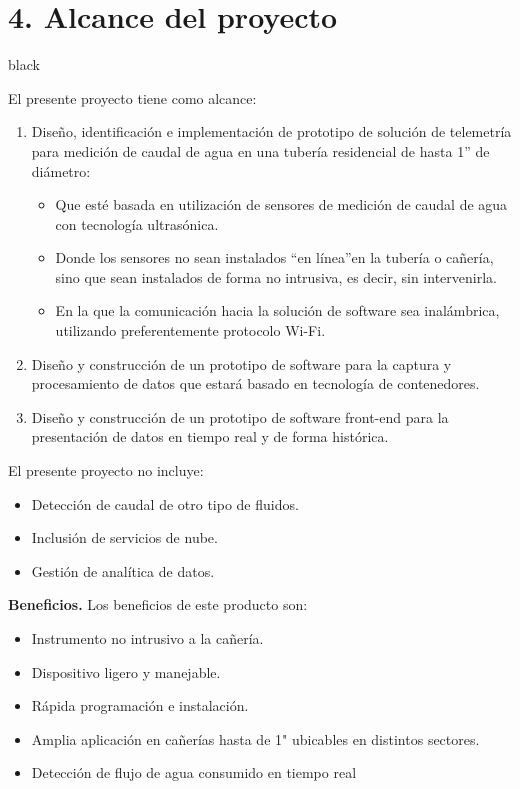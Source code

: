 \documentclass[
11pt, %
codirector, %
]{charter}
\begin{document}
\section{4. Alcance del proyecto}
\label{sec:alcance}

\begin{consigna}{black}

El presente proyecto tiene como alcance:

\begin{enumerate}
\item Diseño, identificación e implementación de prototipo de solución de telemetría para medición de caudal de agua en una tubería residencial de hasta 1'' de diámetro:
\begin{itemize}
	\item Que esté basada en utilización de sensores de medición de caudal de agua con tecnología ultrasónica.
	\item Donde los sensores no sean instalados \textquotedblleft{en línea}\textquotedblright  en la tubería o cañería, sino que sean instalados de forma no intrusiva, es decir, sin intervenirla.
	\item En la que la comunicación hacia la solución de software sea inalámbrica, utilizando preferentemente protocolo Wi-Fi.
\end{itemize}

\item Diseño y construcción de un prototipo de software para la captura y procesamiento de datos que estará basado en tecnología de contenedores.

\item Diseño y construcción de un prototipo de software front-end para la presentación de datos en tiempo real y de forma histórica.

\end{enumerate}

El presente proyecto no incluye:

\begin{itemize}
	\item Detección de caudal de otro tipo de fluidos.
	\item Inclusión de servicios de nube.
	\item Gestión de analítica de datos.
\end{itemize}

\textbf{Beneficios.}  
Los beneficios de este producto son:
\begin{itemize}
	\item Instrumento no intrusivo a la cañería.
	\item Dispositivo ligero y manejable.
	\item Rápida programación e instalación.
	\item Amplia aplicación en cañerías hasta de 1" ubicables en distintos sectores.
	\item Detección de flujo de agua consumido en tiempo real
\end{itemize}
\end{consigna}
\end{document}
